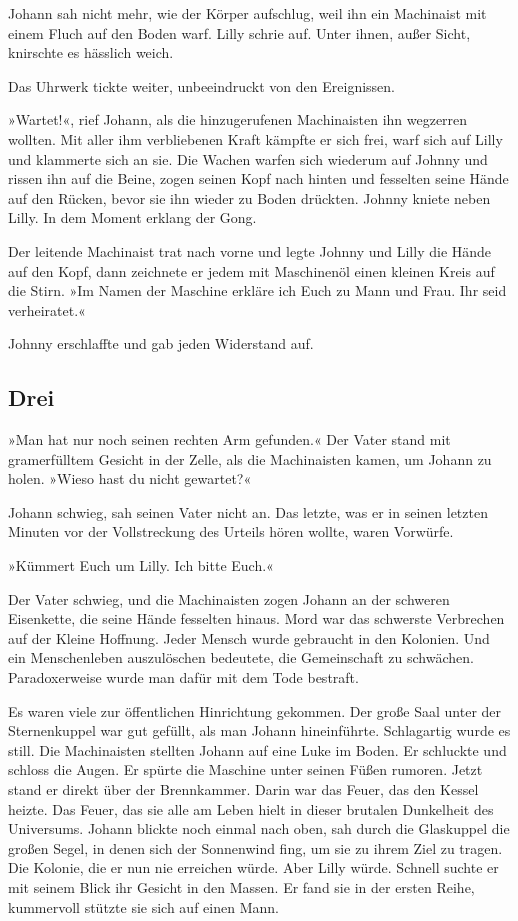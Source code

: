 Johann sah nicht mehr, wie der Körper aufschlug, weil ihn ein
Machinaist mit einem Fluch auf den Boden warf. Lilly schrie auf.
Unter ihnen, außer Sicht, knirschte es hässlich weich.

Das Uhrwerk tickte weiter, unbeeindruckt von den Ereignissen.

»Wartet!«, rief Johann, als die hinzugerufenen Machinaisten ihn
wegzerren wollten. Mit aller ihm verbliebenen Kraft kämpfte er sich
frei, warf sich auf Lilly und klammerte sich an sie. Die Wachen
warfen sich wiederum auf Johnny und rissen ihn auf die Beine, zogen
seinen Kopf nach hinten und fesselten seine Hände auf den Rücken,
bevor sie ihn wieder zu Boden drückten. Johnny kniete neben Lilly.
In dem Moment erklang der Gong.

Der leitende Machinaist trat nach vorne und legte Johnny und Lilly
die Hände auf den Kopf, dann zeichnete er jedem mit Maschinenöl
einen kleinen Kreis auf die Stirn. »Im Namen der Maschine erkläre
ich Euch zu Mann und Frau. Ihr seid verheiratet.«

\bigpar

Johnny erschlaffte und gab jeden Widerstand auf.

\bigpar

\subsection{Drei}

\bigpar

»Man hat nur noch seinen rechten Arm gefunden.« Der Vater stand mit
gramerfülltem Gesicht in der Zelle, als die Machinaisten kamen, um
Johann zu holen. »Wieso hast du nicht gewartet?«

Johann schwieg, sah seinen Vater nicht an. Das letzte, was er in
seinen letzten Minuten vor der Vollstreckung des Urteils hören
wollte, waren Vorwürfe.

»Kümmert Euch um Lilly. Ich bitte Euch.«

Der Vater schwieg, und die Machinaisten zogen Johann an der
schweren Eisenkette, die seine Hände fesselten hinaus. Mord war das
schwerste Verbrechen auf der Kleine Hoffnung. Jeder Mensch wurde
gebraucht in den Kolonien. Und ein Menschenleben auszulöschen
bedeutete, die Gemeinschaft zu schwächen. Paradoxerweise wurde man
dafür mit dem Tode bestraft.

Es waren viele zur öffentlichen Hinrichtung gekommen. Der große
Saal unter der Sternenkuppel war gut gefüllt, als man Johann
hineinführte. Schlagartig wurde es still. Die Machinaisten stellten
Johann auf eine Luke im Boden. Er schluckte und schloss die Augen.
Er spürte die Maschine unter seinen Füßen rumoren. Jetzt stand er
direkt über der Brennkammer. Darin war das Feuer, das den Kessel
heizte. Das Feuer, das sie alle am Leben hielt in dieser brutalen
Dunkelheit des Universums. Johann blickte noch einmal nach oben,
sah durch die Glaskuppel die großen Segel, in denen sich der
Sonnenwind fing, um sie zu ihrem Ziel zu tragen. Die Kolonie, die
er nun nie erreichen würde. Aber Lilly würde. Schnell suchte er mit
seinem Blick ihr Gesicht in den Massen. Er fand sie in der ersten
Reihe, kummervoll stützte sie sich auf einen Mann.

